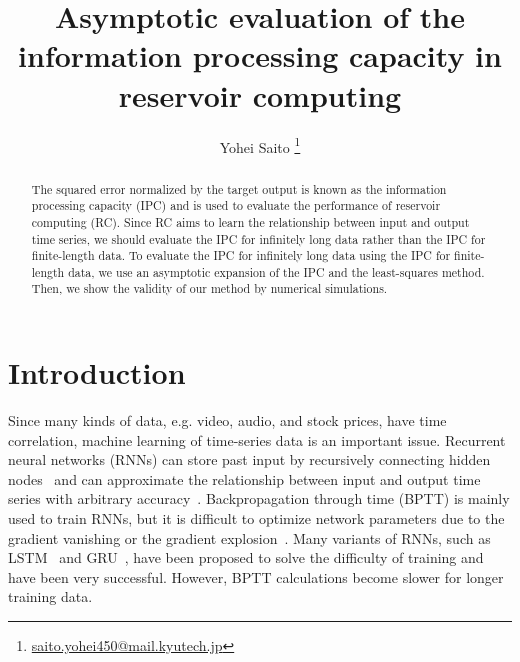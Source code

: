 \documentclass{article}
\title{Asymptotic evaluation of the information processing capacity in reservoir computing}
\author{Yohei Saito \thanks{\href{mailto:saito.yohei450@mail.kyutech.jp}{saito.yohei450@mail.kyutech.jp}}}
\affil{Graduate School of Life Science and Systems Engineering, Kyushu Institute of Technology}
\date{}
\begin{document}
\maketitle
\begin{abstract}
The squared error normalized by the target output is known as the information processing capacity (IPC) and is used to evaluate the performance of reservoir computing (RC). 
Since RC aims to learn the relationship between input and output time series, we should evaluate the IPC for infinitely long data rather than the IPC for finite-length data. 
To evaluate the IPC for infinitely long data using the IPC for finite-length data, we use an asymptotic expansion of the IPC and the least-squares method. 
Then, we show the validity of our method by numerical simulations. 
\begin{comment}
RC の性能評価では教師出力で規格化した二乗誤差が用いられており、IPC と呼ばれている。
RC の目的は入出力関係の学習なので、有限長のデータに対する IPC ではなく、無限長データに対する IPC を推定する必要がある。
しかし十分に長いデータの IPC を計算するだけでは、無限データ長で得られる極限値とのずれは曖昧なままである。
我々は IPC の漸近展開と最小二乗法のフィッティングを用いて無限長データに対する IPC を評価した。
また得られた式を数値シミュレーションを用いて検証し、極限値との残差を確認した。 
\end{comment}
\end{abstract}
\section{Introduction}
\begin{comment}
・時系列データ学習の重要性。RNNによる時系列データの近似と学習の困難さ。LSTMによる困難さの解消。しかし学習時間の長さは依然問題。
・学習時間を短縮したESNの解説。さらにより一般的なRCの説明。RCの長所と短所。
・RCの性能指標としてのIPCとその利点。単純な推定法の問題点。どのように解消するか？
・論文の構成。
\end{comment}
Since many kinds of data, e.g. video, audio, and stock prices, have time correlation, machine learning of time-series data is an important issue. 
Recurrent neural networks (RNNs) can store past input by recursively connecting hidden nodes~\cite{rumelhart1986learning} and can approximate the relationship between input and output time series with arbitrary accuracy~\cite{schafer2006recurrent}. 
Backpropagation through time (BPTT) is mainly used to train RNNs, but it is difficult to optimize network parameters due to the gradient vanishing or the gradient explosion~\cite{bengio1994learning}. 
Many variants of RNNs, such as LSTM~\cite{hochreiter1997long} and GRU~\cite{cho2014learning}, have been proposed to solve the difficulty of training and have been very successful. 
However, BPTT calculations become slower for longer training data. 
\end{document}
